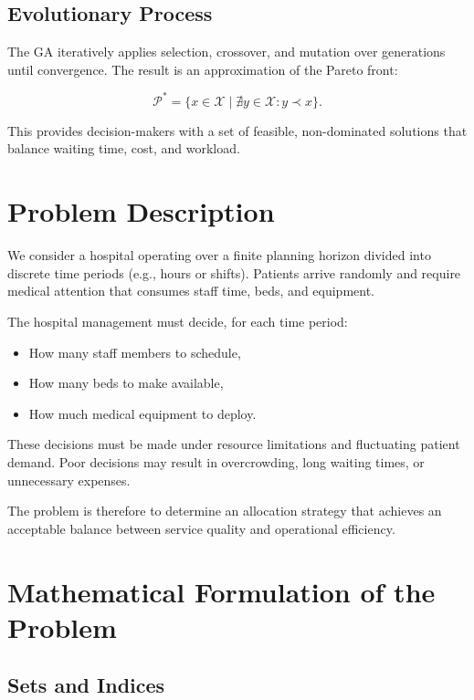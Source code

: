 \documentclass[12pt,a4paper]{article}
\begin{document}
	\subsection{Evolutionary Process}
	
	The GA iteratively applies selection, crossover, and mutation over generations until convergence. 
	The result is an approximation of the Pareto front:
	
	
	\[
	\mathcal{P}^* = \{ x \in \mathcal{X} \mid \nexists y \in \mathcal{X} : y \prec x \}.
	\]
	
	
	
	This provides decision-makers with a set of feasible, non-dominated solutions that balance 
	waiting time, cost, and workload.
	
	
	\section{Problem Description}
	
	We consider a hospital operating over a finite planning horizon divided into discrete time periods (e.g., hours or shifts). Patients arrive randomly and require medical attention that consumes staff time, beds, and equipment.
	
	The hospital management must decide, for each time period:
	\begin{itemize}
		\item How many staff members to schedule,
		\item How many beds to make available,
		\item How much medical equipment to deploy.
	\end{itemize}
	
	These decisions must be made under resource limitations and fluctuating patient demand. Poor decisions may result in overcrowding, long waiting times, or unnecessary expenses.
	
	The problem is therefore to determine an allocation strategy that achieves an acceptable balance between service quality and operational efficiency.
	
	\section{Mathematical Formulation of the Problem}
	
	\subsection{Sets and Indices}
	
\end{document}
